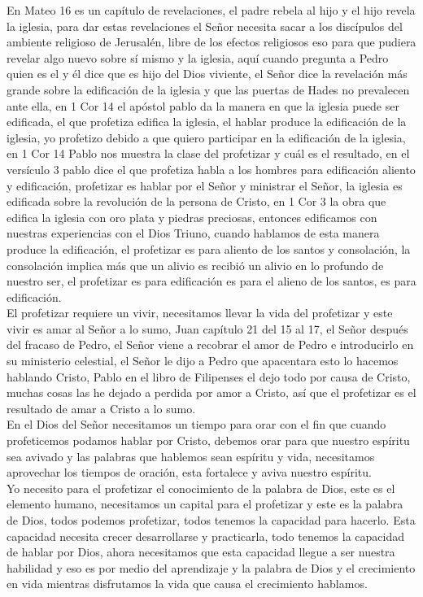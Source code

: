 \documentclass[12pt]{article}
\begin{document}
En Mateo 16 es un capítulo de revelaciones, el padre rebela al hijo y el hijo revela la iglesia, para dar estas revelaciones el Señor necesita sacar a los discípulos del ambiente religioso de Jerusalén, libre de los efectos religiosos eso para que pudiera revelar algo nuevo sobre sí mismo y la iglesia, aquí cuando pregunta a Pedro quien es el y él dice que es hijo del Dios viviente, el Señor dice la revelación más grande sobre la edificación de la iglesia y que las puertas de Hades no prevalecen ante ella, en 1 Cor 14 el apóstol pablo da la manera en que la iglesia puede ser edificada, el que profetiza edifica la iglesia, el hablar produce la edificación de la iglesia, yo profetizo debido a que quiero participar en la edificación de la iglesia, en 1 Cor 14 Pablo nos muestra la clase del profetizar y cuál es el resultado, en el versículo 3 pablo dice el que profetiza habla a los hombres para edificación aliento y edificación, profetizar es hablar por el Señor y ministrar el Señor, la iglesia es edificada sobre la revolución de la persona de Cristo, en 1 Cor 3 la obra que edifica la iglesia con oro plata y piedras preciosas, entonces edificamos con nuestras experiencias con el Dios Triuno, cuando hablamos de esta manera produce la edificación, el profetizar es para aliento de los santos y consolación, la consolación implica más que un alivio es recibió un alivio en lo profundo de nuestro ser, el profetizar es para edificación es para el alieno de los santos, es para edificación.\\

El profetizar requiere un vivir, necesitamos llevar la vida del profetizar y este vivir es amar al Señor a lo sumo, Juan capítulo 21 del 15 al 17, el Señor después del fracaso de Pedro, el Señor viene a recobrar el amor de Pedro e introducirlo en su ministerio celestial, el Señor le dijo a Pedro que apacentara esto lo hacemos hablando Cristo, Pablo en el libro de Filipenses el dejo todo por causa de Cristo, muchas cosas las he dejado a perdida por amor a Cristo, así que el profetizar es el resultado de amar a Cristo a lo sumo.\\

En el Dios del Señor necesitamos un tiempo para orar con el fin que cuando profeticemos podamos hablar por Cristo, debemos orar para que nuestro espíritu sea avivado y las palabras que hablemos sean espíritu y vida, necesitamos aprovechar los tiempos de oración, esta fortalece y aviva nuestro espíritu.\\

Yo necesito para el profetizar el conocimiento de la palabra de Dios, este es el elemento humano, necesitamos un capital para el profetizar y este es la palabra de Dios, todos podemos profetizar, todos tenemos la capacidad para hacerlo. Esta capacidad necesita crecer desarrollarse y practicarla, todo tenemos la capacidad de hablar por Dios, ahora necesitamos que esta capacidad llegue a ser nuestra habilidad y eso es por medio del aprendizaje y la palabra de Dios y el crecimiento en vida mientras disfrutamos la vida que causa el crecimiento hablamos.\\
\end{document}
